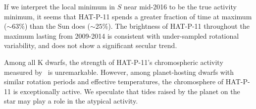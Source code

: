 If we interpret the local minimum in $S$ near mid-2016 to be the true activity minimum, it seems that HAT-P-11 spends a greater fraction of time at maximum ($\sim 63\%$)  than the Sun does ($\sim 25\%$). The brightness of HAT-P-11 throughout the maximum lasting from 2009-2014 is consistent with under-sampled rotational variability, and does not show a significant secular trend. 

Among all K dwarfs, the strength of HAT-P-11's chromospheric activity measured by \rprime\ is unremarkable. However, among planet-hosting dwarfs with similar rotation periods and effective temperatures, the chromosphere of HAT-P-11 is exceptionally active. We speculate that tides raised by the planet on the star may play a role in the atypical activity.








